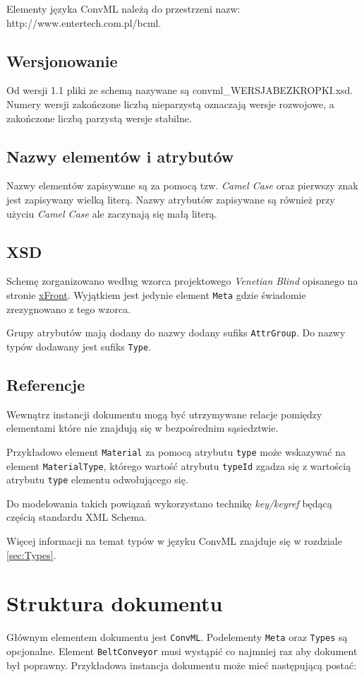 \documentclass[12pt,a4paper]{article}
\begin{document}
Elementy języka ConvML należą do przestrzeni nazw:
http://www.entertech.com.pl/bcml.

\subsection{Wersjonowanie}
Od wersji 1.1 pliki ze schemą nazywane są convml\_WERSJABEZKROPKI.xsd. Numery
wersji zakończone liczbą nieparzystą oznaczają wersje rozwojowe, a zakończone
liczbą parzystą wersje stabilne.

\subsection{Nazwy elementów i atrybutów}
Nazwy elementów zapisywane są za pomocą tzw. \emph{Camel Case} oraz pierwszy znak jest
zapisywany wielką literą. Nazwy atrybutów zapisywane są również przy użyciu
\emph{Camel Case} ale zaczynają się małą literą.

\subsection{XSD}
Schemę zorganizowano według wzorca projektowego \emph{Venetian Blind} opisanego na
stronie \href{http://www.xfront.com/GlobalVersusLocal.html}{xFront}. Wyjątkiem jest
jedynie element {\tt Meta} gdzie świadomie zrezygnowano z tego wzorca.

Grupy atrybutów mają dodany do nazwy dodany sufiks {\tt AttrGroup}. Do nazwy typów
dodawany jest sufiks {\tt Type}.

\subsection{Referencje}
Wewnątrz instancji dokumentu mogą być utrzymywane relacje pomiędzy elementami
które nie znajdują się w bezpośrednim sąsiedztwie.

Przykładowo element {\tt Material} za pomocą atrybutu {\tt type} może wskazywać na
element {\tt MaterialType}, którego wartość atrybutu {\tt typeId} zgadza się z
wartością atrybutu {\tt type} elementu odwołującego się.

Do modelowania takich powiązań wykorzystano technikę \emph{key/keyref} będącą
częścią standardu XML Schema.

Więcej informacji na temat typów w języku ConvML znajduje się w rozdziale
\ref{sec:Types}.


\section{Struktura dokumentu}
Głównym elementem dokumentu jest {\tt ConvML}.  Podelementy {\tt Meta} oraz
{\tt Types} są opcjonalne. Element {\tt BeltConveyor} musi wystąpić co
najmniej raz aby dokument był poprawny.  Przykładowa instancja dokumentu może
mieć następującą postać:
\end{document}
